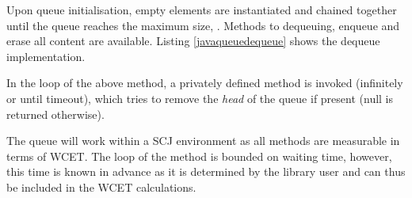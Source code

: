 

Upon queue initialisation, empty elements are instantiated and chained together until the queue reaches the maximum size, . Methods to dequeuing, enqueue and erase all content are available. Listing \ref{javaqueuedequeue} shows the dequeue implementation.



In the loop of the above method, a privately defined  method is invoked (infinitely or until timeout), which tries to remove the \textit{head} of the queue if present (null is returned otherwise).

The queue will work within a SCJ environment as all methods are measurable in terms of WCET. The loop of the  method is bounded on waiting time, however, this time is known in advance as it is determined by the library user and can thus be included in the WCET calculations.